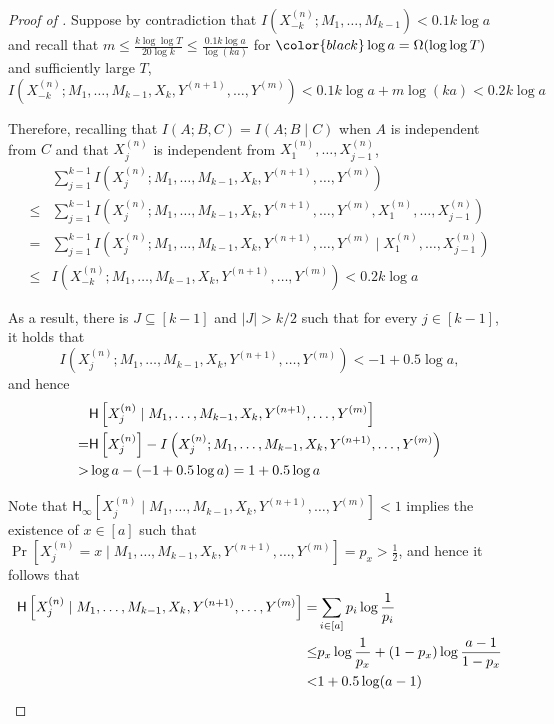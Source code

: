 \documentclass{toc}
\newcommand{\cond}{\;|\;}
\newcommand{\entropy}{\ensuremath{\mathsf{H}}}
\newcommand{\Hmin}{\ensuremath{\mathsf{H}_{\infty}}}
\begin{document}
\begin{proof}[Proof of ]
		Suppose  by contradiction that
		$I\left(X^{(n)}_{-k}; M_1,\ldots, M_{k-1}\right)<0.1 k\log a$ and recall that $m \le\frac{k\log\log T}{20\log k} \le\frac{0.1 k\log a}{\log (ka)}$ for ${\color{black}\log a=\Omega(\log \log T)}$ and sufficiently large $T$,
		$$ I\left(X^{(n)}_{-k}; M_1,\ldots, M_{k-1}, X_k, Y^{(n+1)},\ldots, Y^{(m)} \right)<0.1 k\log a + {m\log(ka)}<0.2 k\log a$$

		Therefore, recalling that $I(A;B,C)=I(A;B\cond C)$ when $A$ is independent from $C$ and that $X_j^{(n)}$ is independent from $X^{(n)}_1,\ldots, X^{(n)}_{j-1}$, 
		\begin{align*}
			& \sum_{j=1}^{k-1} I\left(X^{(n)}_{j}; M_1,\ldots, M_{k-1}, X_k, Y^{(n+1)},\ldots, Y^{(m)} \right) \\
			\le & \sum_{j=1}^{k-1} I\left(X^{(n)}_{j}; M_1,\ldots, M_{k-1}, X_k, Y^{(n+1)},\ldots, Y^{(m)}, X^{(n)}_1,\ldots, X^{(n)}_{j-1} \right) \\
			= & \sum_{j=1}^{k-1} I\left(X^{(n)}_{j}; M_1,\ldots, M_{k-1}, X_k, Y^{(n+1)},\ldots, Y^{(m)} \cond X^{(n)}_1,\ldots, X^{(n)}_{j-1} \right)\\
			\le & I(X^{(n)}_{-k}; M_1,\ldots, M_{k-1}, X_k, Y^{(n+1)},\ldots, Y^{(m)} ) <0.2 k\log a
		\end{align*}
		
		As a result, there is $J\subseteq [k-1]$ and $|J|>k/2$ such that for every $j\in [k-1]$, it holds that
		$$I\left(X^{(n)}_{j}; M_1,\ldots, M_{k-1}, X_k, Y^{(n+1)},\ldots, Y^{(m)} \right)<-1+ 0.5\log a,$$
		and hence 
		\begin{align}
			&\entropy\left[X^{(n)}_{j} \cond M_1,\ldots, M_{k-1}, X_k, Y^{(n+1)},\ldots, Y^{(m)} \right] \notag\\
			= &\entropy\left[X^{(n)}_{j}\right] -  I\left(X^{(n)}_{j}; M_1,\ldots, M_{k-1}, X_k, Y^{(n+1)},\ldots, Y^{(m)} \right)\notag\\
			>& \log a - (-1+ 0.5\log a) = 1+ 0.5\log a \label{ineq:lower bound for H}
		\end{align}
	
		Note that
		$\Hmin\left[X^{(n)}_{j} \cond M_1,\ldots, M_{k-1}, X_k, Y^{(n+1)},\ldots, Y^{(m)} \right] <1$ implies the existence of $x\in [a]$ such that  $\Pr\left[X^{(n)}_{j}=x \cond M_1,\ldots, M_{k-1}, X_k, Y^{(n+1)},\ldots, Y^{(m)} \right]=p_x>\frac{1}{2}$,
		and hence it follows that 
		\begin{align}
			\entropy\left[X^{(n)}_{j} \cond M_1,\ldots, M_{k-1}, X_k, Y^{(n+1)},\ldots, Y^{(m)} \right] 
			=& \sum_{i\in[a]} p_i\log\frac{1}{p_i} \notag \\
			\le & p_x\log \frac{1}{p_x}+(1-p_x)\log\frac{a-1}{1-p_x}\notag\\
			< & 1+0.5\log (a-1) \label{ineq:upper bound for H}
		\end{align}


\end{proof}
\end{document}
